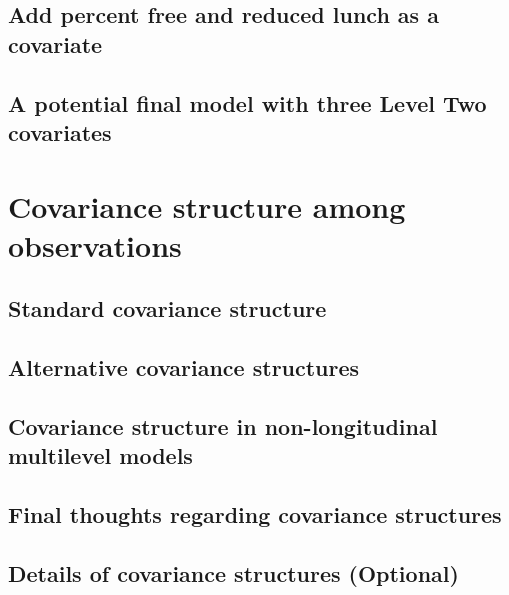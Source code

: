 \documentclass[
]{krantz}
\begin{document}
\hypertarget{modeld}{%
\subsection{Add percent free and reduced lunch as a covariate}\label{modeld}}

\hypertarget{modelf9}{%
\subsection{A potential final model with three Level Two covariates}\label{modelf9}}

\hypertarget{errorcovariance}{%
\section{Covariance structure among observations}\label{errorcovariance}}

\hypertarget{standarderror}{%
\subsection{Standard covariance structure}\label{standarderror}}

\hypertarget{alternateerror}{%
\subsection{Alternative covariance structures}\label{alternateerror}}

\hypertarget{covariance-structure-in-non-longitudinal-multilevel-models}{%
\subsection{Covariance structure in non-longitudinal multilevel models}\label{covariance-structure-in-non-longitudinal-multilevel-models}}

\hypertarget{final-thoughts-regarding-covariance-structures}{%
\subsection{Final thoughts regarding covariance structures}\label{final-thoughts-regarding-covariance-structures}}

\hypertarget{optionalcov}{%
\subsection{Details of covariance structures (Optional)}\label{optionalcov}}
\end{document}
